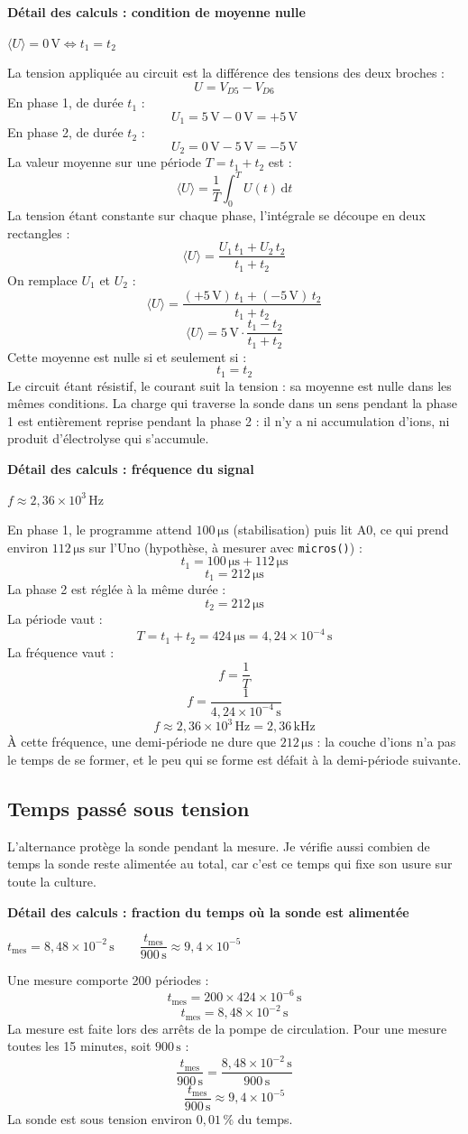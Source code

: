 \documentclass[11pt,a4paper]{article}
\newcommand{\resultat}[1]{\begin{center}{\large\color{bleuENO}$\displaystyle #1$}\end{center}}
\newenvironment{demo}[2]{\par\medskip\noindent\textbf{Détail des calculs : #1}\par\nopagebreak\resultat{#2}}{\par\medskip}
\newcommand{\calcul}[2]{\par\medskip\noindent\textbf{Détail des calculs : #1}\par\nopagebreak\resultat{#2}}
\newcommand{\U}[1]{\,\mathrm{#1}}
\begin{document}
\begin{demo}{condition de moyenne nulle}{\langle U \rangle = 0\,\mathrm{V} \iff t_1 = t_2}
La tension appliquée au circuit est la différence des tensions des deux broches :
\[
U = V_{D5} - V_{D6}
\]
En phase 1, de durée $t_1$ :
\[
U_1 = 5\U{V} - 0\U{V} = +5\U{V}
\]
En phase 2, de durée $t_2$ :
\[
U_2 = 0\U{V} - 5\U{V} = -5\U{V}
\]
La valeur moyenne sur une période $T = t_1 + t_2$ est :
\[
\langle U \rangle = \frac{1}{T} \int_0^T U(t) \, \mathrm{d}t
\]
La tension étant constante sur chaque phase, l'intégrale se découpe en deux rectangles :
\[
\langle U \rangle = \frac{U_1 \, t_1 + U_2 \, t_2}{t_1 + t_2}
\]
On remplace $U_1$ et $U_2$ :
\[
\langle U \rangle = \frac{(+5\U{V}) \, t_1 + (-5\U{V}) \, t_2}{t_1 + t_2}
\]
\[
\langle U \rangle = 5\U{V} \cdot \frac{t_1 - t_2}{t_1 + t_2}
\]
Cette moyenne est nulle si et seulement si :
\[
t_1 = t_2
\]
Le circuit étant résistif, le courant suit la tension : sa moyenne est nulle dans les mêmes conditions. La charge qui traverse la sonde dans un sens pendant la phase 1 est entièrement reprise pendant la phase 2 : il n'y a ni accumulation d'ions, ni produit d'électrolyse qui s'accumule.
\end{demo}

\calcul{fréquence du signal}{f \approx 2{,}36 \times 10^{3}\,\mathrm{Hz}}
En phase 1, le programme attend $100\U{\mu s}$ (stabilisation) puis lit A0, ce qui prend environ $112\U{\mu s}$ sur l'Uno (hypothèse, à mesurer avec \texttt{micros()}) :
\[
t_1 = 100\U{\mu s} + 112\U{\mu s}
\]
\[
t_1 = 212\U{\mu s}
\]
La phase 2 est réglée à la même durée :
\[
t_2 = 212\U{\mu s}
\]
La période vaut :
\[
T = t_1 + t_2 = 424\U{\mu s} = 4{,}24 \times 10^{-4}\U{s}
\]
La fréquence vaut :
\[
f = \frac{1}{T}
\]
\[
f = \frac{1}{4{,}24 \times 10^{-4}\U{s}}
\]
\[
f \approx 2{,}36 \times 10^{3}\U{Hz} = 2{,}36\U{kHz}
\]
À cette fréquence, une demi-période ne dure que $212\U{\mu s}$ : la couche d'ions n'a pas le temps de se former, et le peu qui se forme est défait à la demi-période suivante.

\subsection{Temps passé sous tension}

L'alternance protège la sonde pendant la mesure. Je vérifie aussi combien de temps la sonde reste alimentée au total, car c'est ce temps qui fixe son usure sur toute la culture.


\calcul{fraction du temps où la sonde est alimentée}{t_{\text{mes}} = 8{,}48 \times 10^{-2}\,\mathrm{s} \qquad \dfrac{t_{\text{mes}}}{900\,\mathrm{s}} \approx 9{,}4 \times 10^{-5}}
Une mesure comporte 200 périodes :
\[
t_{\text{mes}} = 200 \times 424 \times 10^{-6}\U{s}
\]
\[
t_{\text{mes}} = 8{,}48 \times 10^{-2}\U{s}
\]
La mesure est faite lors des arrêts de la pompe de circulation. Pour une mesure toutes les 15 minutes, soit $900\U{s}$ :
\[
\frac{t_{\text{mes}}}{900\U{s}} = \frac{8{,}48 \times 10^{-2}\U{s}}{900\U{s}}
\]
\[
\frac{t_{\text{mes}}}{900\U{s}} \approx 9{,}4 \times 10^{-5}
\]
La sonde est sous tension environ $0{,}01\U{\%}$ du temps.
\end{document}
